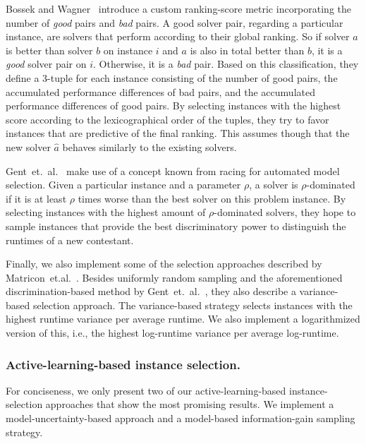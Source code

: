 \documentclass[runningheads]{llncs}
\begin{document}
Bossek and Wagner~\cite{Bossek021a} introduce a custom ranking-score metric incorporating the number of \textit{good} pairs and \textit{bad} pairs.
A good solver pair, regarding a particular instance, are solvers that perform according to their global ranking.
So if solver $a$ is better than solver $b$ on instance $i$ and $a$ is also in total better than $b$, it is a \textit{good} solver pair on $i$.
Otherwise, it is a \textit{bad} pair.
Based on this classification, they define a 3-tuple for each instance consisting of the number of good pairs, the accumulated performance differences of bad pairs, and the accumulated performance differences of good pairs.
By selecting instances with the highest score according to the lexicographical order of the tuples, they try to favor instances that are predictive of the final ranking.
This assumes though that the new solver $\hat{a}$ behaves similarly to the existing solvers.

Gent~et.~al.~\cite{GentHJKMNN14} make use of a concept known from racing for automated model selection.
Given a particular instance and a parameter $\rho$, a solver is $\rho$-dominated if it is at least $\rho$ times worse than the best solver on this problem instance.
By selecting instances with the highest amount of $\rho$-dominated solvers, they hope to sample instances that provide the best discriminatory power to distinguish the runtimes of a new contestant.

Finally, we also implement some of the selection approaches described by Matricon~et.al.~\cite{MatriconAFSH21}.
Besides uniformly random sampling and the aforementioned discrimination-based method by Gent~et.~al.~\cite{GentHJKMNN14}, they also describe a variance-based selection approach.
The variance-based strategy selects instances with the highest runtime variance per average runtime. We also implement a logarithmized version of this, i.e., the highest log-runtime variance per average log-runtime.
 
\subsubsection{Active-learning-based instance selection.}
\label{sec:sampling2}
For conciseness, we only present two of our active-learning-based instance-selection approaches that show the most promising results.
We implement a model-uncertainty-based approach and a model-based information-gain sampling strategy.
\end{document}
